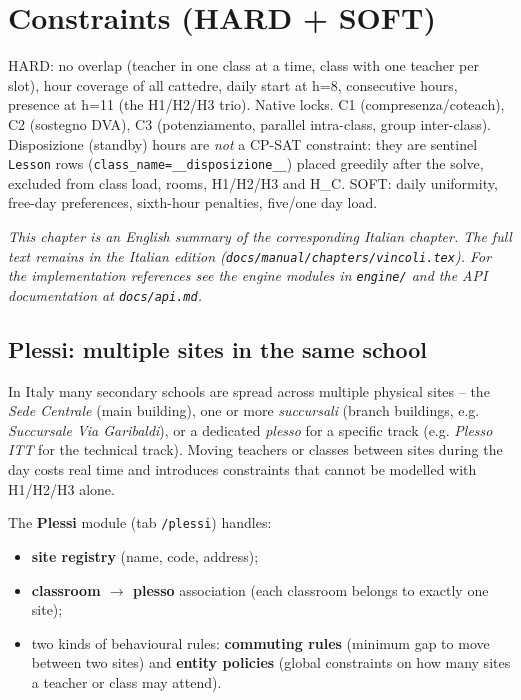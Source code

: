 \chapter{Constraints (HARD + SOFT)}
\label{ch:vincoli_en}

HARD: no overlap (teacher in one class at a time, class with one teacher per slot), hour coverage of all cattedre, daily start at h=8, consecutive hours, presence at h=11 (the H1/H2/H3 trio). Native locks. C1 (compresenza/coteach), C2 (sostegno DVA), C3 (potenziamento, parallel intra-class, group inter-class). Disposizione (standby) hours are \emph{not} a CP-SAT constraint: they are sentinel \texttt{Lesson} rows (\texttt{class\_name=\_\_disposizione\_\_}) placed greedily after the solve, excluded from class load, rooms, H1/H2/H3 and H\_C. SOFT: daily uniformity, free-day preferences, sixth-hour penalties, five/one day load.

\medskip
\noindent
\textit{This chapter is an English summary of the corresponding Italian chapter. The full text remains in the Italian edition (\texttt{docs/manual/chapters/vincoli.tex}). For the implementation references see the engine modules in \texttt{engine/} and the API documentation at \texttt{docs/api.md}.}

\section{Plessi: multiple sites in the same school}
\label{sec:plessi_en}

In Italy many secondary schools are spread across multiple
physical sites -- the \emph{Sede Centrale} (main building),
one or more \emph{succursali} (branch buildings, e.g.
\emph{Succursale Via Garibaldi}), or a dedicated
\emph{plesso} for a specific track (e.g. \emph{Plesso ITT}
for the technical track). Moving teachers or classes
between sites during the day costs real time and introduces
constraints that cannot be modelled with H1/H2/H3 alone.

The \textbf{Plessi} module (tab \texttt{/plessi}) handles:
\begin{itemize}
\item \textbf{site registry} (name, code, address);
\item \textbf{classroom $\to$ plesso} association (each
classroom belongs to exactly one site);
\item two kinds of behavioural rules:
\textbf{commuting rules} (minimum gap to move between two
sites) and \textbf{entity policies} (global constraints on
how many sites a teacher or class may attend).
\end{itemize}

